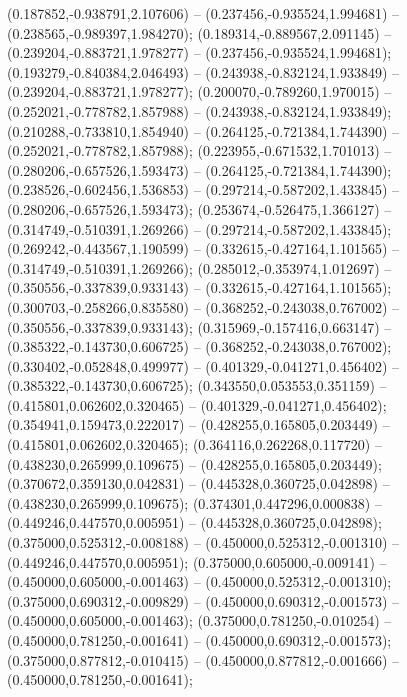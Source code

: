  (0.187852,-0.938791,2.107606) -- (0.237456,-0.935524,1.994681) -- (0.238565,-0.989397,1.984270);
 (0.189314,-0.889567,2.091145) -- (0.239204,-0.883721,1.978277) -- (0.237456,-0.935524,1.994681);
 (0.193279,-0.840384,2.046493) -- (0.243938,-0.832124,1.933849) -- (0.239204,-0.883721,1.978277);
 (0.200070,-0.789260,1.970015) -- (0.252021,-0.778782,1.857988) -- (0.243938,-0.832124,1.933849);
 (0.210288,-0.733810,1.854940) -- (0.264125,-0.721384,1.744390) -- (0.252021,-0.778782,1.857988);
 (0.223955,-0.671532,1.701013) -- (0.280206,-0.657526,1.593473) -- (0.264125,-0.721384,1.744390);
 (0.238526,-0.602456,1.536853) -- (0.297214,-0.587202,1.433845) -- (0.280206,-0.657526,1.593473);
 (0.253674,-0.526475,1.366127) -- (0.314749,-0.510391,1.269266) -- (0.297214,-0.587202,1.433845);
 (0.269242,-0.443567,1.190599) -- (0.332615,-0.427164,1.101565) -- (0.314749,-0.510391,1.269266);
 (0.285012,-0.353974,1.012697) -- (0.350556,-0.337839,0.933143) -- (0.332615,-0.427164,1.101565);
 (0.300703,-0.258266,0.835580) -- (0.368252,-0.243038,0.767002) -- (0.350556,-0.337839,0.933143);
 (0.315969,-0.157416,0.663147) -- (0.385322,-0.143730,0.606725) -- (0.368252,-0.243038,0.767002);
 (0.330402,-0.052848,0.499977) -- (0.401329,-0.041271,0.456402) -- (0.385322,-0.143730,0.606725);
 (0.343550,0.053553,0.351159) -- (0.415801,0.062602,0.320465) -- (0.401329,-0.041271,0.456402);
 (0.354941,0.159473,0.222017) -- (0.428255,0.165805,0.203449) -- (0.415801,0.062602,0.320465);
 (0.364116,0.262268,0.117720) -- (0.438230,0.265999,0.109675) -- (0.428255,0.165805,0.203449);
 (0.370672,0.359130,0.042831) -- (0.445328,0.360725,0.042898) -- (0.438230,0.265999,0.109675);
 (0.374301,0.447296,0.000838) -- (0.449246,0.447570,0.005951) -- (0.445328,0.360725,0.042898);
 (0.375000,0.525312,-0.008188) -- (0.450000,0.525312,-0.001310) -- (0.449246,0.447570,0.005951);
 (0.375000,0.605000,-0.009141) -- (0.450000,0.605000,-0.001463) -- (0.450000,0.525312,-0.001310);
 (0.375000,0.690312,-0.009829) -- (0.450000,0.690312,-0.001573) -- (0.450000,0.605000,-0.001463);
 (0.375000,0.781250,-0.010254) -- (0.450000,0.781250,-0.001641) -- (0.450000,0.690312,-0.001573);
 (0.375000,0.877812,-0.010415) -- (0.450000,0.877812,-0.001666) -- (0.450000,0.781250,-0.001641);

